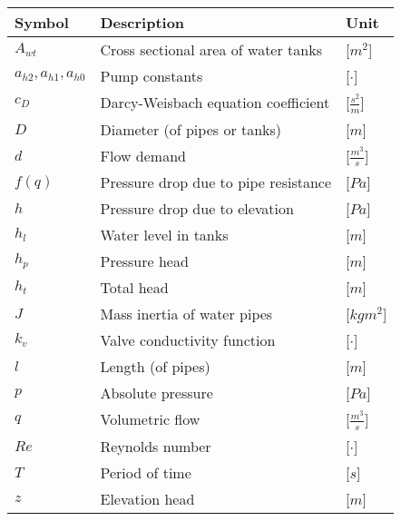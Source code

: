 \begin{tabular}{l l l} 
	\textbf{Symbol}		&	\textbf{Description}								& \hspace{25mm}\textbf{Unit}	\\\hline

	$A_{wt}$ 			&	Cross sectional area of water tanks	 				& \hspace{25mm}[$m^2$]\\
	$a_{h2},a_{h1},a_{h0}$ &	Pump constants	 								& \hspace{25mm}[$\cdot$]\\
	$c_D$				&	Darcy-Weisbach equation coefficient	 				& \hspace{25mm}[$\frac{s^2}{m}$]\\
	$D$					&	Diameter (of pipes or tanks)						& \hspace{25mm}[$m$]\\
	$d$					&	Flow demand	 										& \hspace{25mm}[$\frac{m^3}{s}$]\\
	$f(q)$				&	Pressure drop due to pipe resistance				& \hspace{25mm}[$Pa$]\\
	$h$					&	Pressure drop due to elevation					    & \hspace{25mm}[$Pa$]\\
	$h_{l}$				&	Water level in tanks							    & \hspace{25mm}[$m$]\\
	$h_p$				&	Pressure head									    & \hspace{25mm}[$m$]\\
	$h_t$				&	Total head									        & \hspace{25mm}[$m$]\\
	$J$					&	Mass inertia of water pipes							& \hspace{25mm}[$kgm^2$]\\
	$k_v$				&	Valve conductivity function							& \hspace{25mm}[$\cdot$]\\
	$l$					&	Length (of pipes)									& \hspace{25mm}[$m$]\\
	$p$					&	Absolute pressure									& \hspace{25mm}[$Pa$]\\
	$q$					&	Volumetric flow									    & \hspace{25mm}[$\frac{m^3}{s}$]\\
	$Re$				&	Reynolds number								        & \hspace{25mm}[$\cdot$]\\
	$T$					&	Period of time								        & \hspace{25mm}[$s$]\\
	$z$					&	Elevation head									    & \hspace{25mm}[$m$]\\


\end{tabular}
